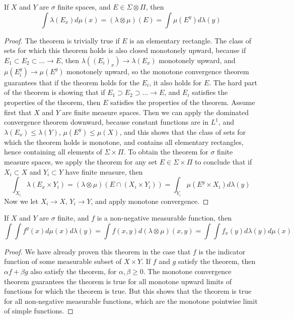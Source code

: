 \begin{theorem}
    If $X$ and $Y$ are $\sigma$ finite spaces, and $E \in \Sigma \otimes \Pi$, then
    \[ \int \lambda(E_x) d\mu(x) = (\lambda \otimes \mu)(E) = \int \mu(E^y) d\lambda(y) \]
\end{theorem}
\begin{proof}
    The theorem is trivially true if $E$ is an elementary rectangle. The class of sets for which this theorem holds is also closed monotonely upward, because if $E_1 \subset E_2 \subset \dots \to E$, then $\lambda((E_i)_x) \to \lambda(E_x)$ monotonely upward, and $\mu(E_i^y) \to \mu(E^y)$ monotonely upward, so the monotone convergence theorem guarantees that if the theorem holds for the $E_i$, it also holds for $E$. The hard part of the theorem is showing that if $E_1 \supset E_2 \supset \dots \to E$, and $E_i$ satisfies the properties of the theorem, then $E$ satisfies the properties of the theorem. Assume first that $X$ and $Y$ are finite measure spaces. Then we can apply the dominated convergence theorem downward, because constant functions are in $L^1$, and $\lambda(E_x) \leq \lambda(Y)$, $\mu(E^y) \leq \mu(X)$, and this shows that the class of sets for which the theorem holds is monotone, and contains all elementary rectangles, hence containing all elements of $\Sigma \times \Pi$. To obtain the theorem for $\sigma$ finite measure spaces, we apply the theorem for any set $E \in \Sigma \times \Pi$ to conclude that if $X_i \subset X$ and $Y_i \subset Y$ have finite measure, then
    \[ \int_{X_i} \lambda(E_x \times Y_i) = (\lambda \otimes \mu)(E \cap (X_i \times Y_i)) = \int_{Y_i} \mu(E^y \times X_i) d\lambda(y) \]
    Now we let $X_i \to X$, $Y_i \to Y$, and apply monotone convergence.
\end{proof}

\begin{theorem}[Tonelli]
    If $X$ and $Y$ are $\sigma$ finite, and $f$ is a non-negative measurable function, then
    \[ \int \int f^y(x) d\mu(x) d\lambda(y) = \int f(x,y) d(\lambda \otimes \mu)(x,y) = \int \int f_x(y) d\lambda(y) d\mu(x) \]
\end{theorem}
\begin{proof}
    We have already proven this theorem in the case that $f$ is the indicator function of some measurable subset of $X \times Y$. If $f$ and $g$ satisfy the theorem, then $\alpha f + \beta g$ also satisfy the theorem, for $\alpha, \beta \geq 0$. The monotone convergence theorem guarantees the theorem is true for all monotone upward limits of functions for which the theorem is true. But this shows that the theorem is true for all non-negative measurable functions, which are the monotone pointwise limit of simple functions.
\end{proof}


